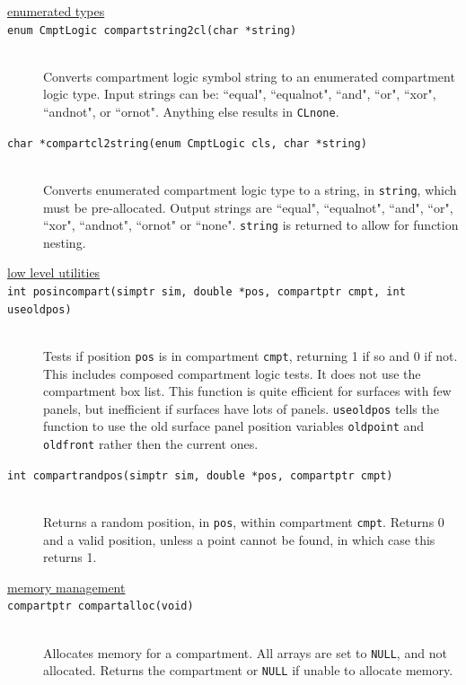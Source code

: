\documentclass {scrbook}
\newcommand {\ttt} {\texttt}
\begin{document}
\begin{description}

\item[\underline{enumerated types}]

\item[\ttt{enum CmptLogic compartstring2cl(char *string)}]
\hfill \\
Converts compartment logic symbol string to an enumerated compartment logic type. Input strings can be: ``equal", ``equalnot", ``and", ``or", ``xor", ``andnot", or ``ornot". Anything else results in \ttt{CLnone}.

\item[\ttt{char *compartcl2string(enum CmptLogic cls, char *string)}]
\hfill \\
Converts enumerated compartment logic type to a string, in \ttt{string}, which must be pre-allocated. Output strings are ``equal", ``equalnot", ``and", ``or", ``xor", ``andnot", ``ornot" or ``none". \ttt{string} is returned to allow for function nesting.

\item[\underline{low level utilities}]

\item[\ttt{int posincompart(simptr sim, double *pos, compartptr cmpt, int useoldpos)}]
\hfill \\
Tests if position \ttt{pos} is in compartment \ttt{cmpt}, returning 1 if so and 0 if not. This includes composed compartment logic tests. It does not use the compartment box list. This function is quite efficient for surfaces with few panels, but inefficient if surfaces have lots of panels. \ttt{useoldpos} tells the function to use the old surface panel position variables \ttt{oldpoint} and \ttt{oldfront} rather then the current ones.

\item[\ttt{int compartrandpos(simptr sim, double *pos, compartptr cmpt)}]
\hfill \\
Returns a random position, in \ttt{pos}, within compartment \ttt{cmpt}. Returns 0 and a valid position, unless a point cannot be found, in which case this returns 1.

\item[\underline{memory management}]

\item[\ttt{compartptr compartalloc(void)}]
\hfill \\
Allocates memory for a compartment. All arrays are set to \ttt{NULL}, and not allocated. Returns the compartment or \ttt{NULL} if unable to allocate memory.


\end{description}
\end{document}
